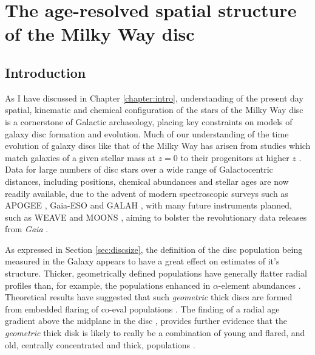 \chapter{The age-resolved spatial structure of the Milky Way disc}
\label{chapter:apogeestruc}
\section{Introduction}

As I have discussed in Chapter \ref{chapter:intro}, understanding of the present day spatial, kinematic and chemical configuration of the stars of the Milky Way disc is a cornerstone of Galactic archaeology, placing key constraints on models of galaxy disc formation and evolution. Much of our understanding of the time evolution of galaxy discs like that of the Milky Way has arisen from studies which match galaxies of a given stellar mass at $z=0$ to their progenitors at higher $z$ \citep[and therefore, lookback time, e.g.][]{2013ApJ...771L..35V,2015ApJ...803...26P,2016MNRAS.462.4495H}. 
Data for large numbers of disc stars over a wide range of Galactocentric distances, including positions, chemical abundances and stellar ages are now readily available, due to the advent of modern spectroscopic surveys such as APOGEE \citep{2015arXiv150905420M}, Gaia-ESO \citep{2012Msngr.147...25G} and GALAH \citep{2016arXiv160902822M}, with many future instruments planned, such as WEAVE \citep{2014SPIE.9147E..0LD} and MOONS \citep{2012SPIE.8446E..0SC}, aiming to bolster the revolutionary data releases from \emph{Gaia} \citep{2016A&A...595A...1G}.

As expressed in Section \ref{sec:discsize}, the definition of the disc population being measured in the Galaxy appears to have a great effect on estimates of it's structure. Thicker, geometrically defined populations have generally flatter radial profiles \citep[e.g.][]{2008ApJ...673..864J} than, for example, the populations enhanced in $\alpha$-element abundances \citep[e.g.][]{2012ApJ...752...51C,2012ApJ...753..148B,2016ApJ...823...30B}. Theoretical results have suggested that such \emph{geometric} thick discs are formed from embedded flaring of co-eval populations  \citep{2015ApJ...804L...9M}. The finding of a radial age gradient above the midplane in the disc \citep[e.g.][]{2016arXiv160901168M}, provides further evidence that the \emph{geometric} thick disk is likely to really be a combination of young and flared, and old, centrally concentrated and thick, populations \citep[as predicted by the models of][]{2015ApJ...804L...9M}.

